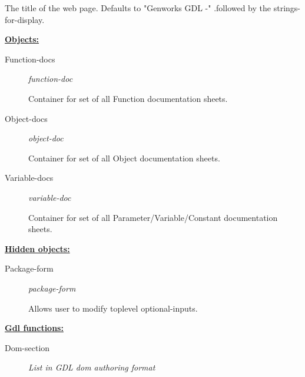 \documentclass [11pt]{book}
\begin{document}
\begin{itemize}
\begin{description}
 The title of the web page. Defaults to "Genworks GDL -"
.followed by the strings-for-display.




\end{description}






\textbf{
\underline{Objects:}}

\begin{description}

\item [Function-docs]
\emph{function-doc}

 Container for set of all Function documentation sheets.




\item [Object-docs]
\emph{object-doc}

 Container for set of all Object documentation sheets.




\item [Variable-docs]
\emph{variable-doc}

 Container for set of all Parameter/Variable/Constant documentation sheets.




\end{description}






\textbf{
\underline{Hidden objects:}}

\begin{description}

\item [Package-form]
\emph{package-form}

 Allows user to modify toplevel optional-inputs.




\end{description}






\textbf{
\underline{Gdl functions:}}

\begin{description}

\item [Dom-section]
\emph{List in GDL dom authoring format}


\end{description}
\end{itemize}
\end{document}
